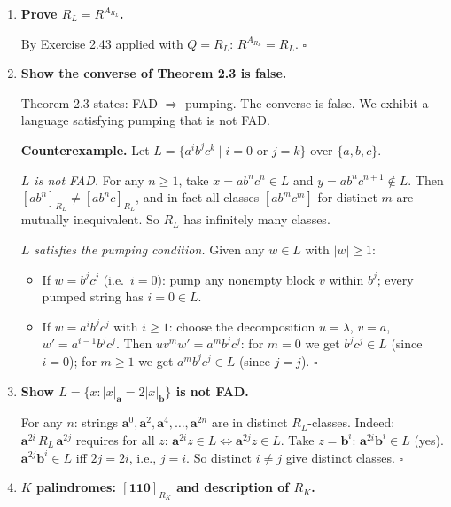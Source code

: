 \begin{enumerate}[{2.}1.]
\item \textbf{Prove $R_L=R^{A_{R_L}}$.}

By Exercise 2.43 applied with $Q=R_L$: $R^{A_{R_L}}=R_L$. $\square$

\item \textbf{Show the converse of Theorem 2.3 is false.}

Theorem 2.3 states: FAD $\Rightarrow$ pumping. The converse is false. We exhibit a language satisfying pumping that is not FAD.

\textbf{Counterexample.} Let $L=\{a^ib^jc^k\mid i=0\text{ or }j=k\}$ over $\{a,b,c\}$.

\emph{$L$ is not FAD.} For any $n\geq 1$, take $x=ab^nc^n\in L$ and $y=ab^nc^{n+1}\notin L$. Then $[ab^n]_{R_L}\neq[ab^nc]_{R_L}$, and in fact all classes $[ab^mc^m]$ for distinct $m$ are mutually inequivalent. So $R_L$ has infinitely many classes.

\emph{$L$ satisfies the pumping condition.} Given any $w\in L$ with $|w|\geq 1$:
\begin{itemize}
\item If $w=b^jc^j$ (i.e.\ $i=0$): pump any nonempty block $v$ within $b^j$; every pumped string has $i=0\in L$.
\item If $w=a^ib^jc^j$ with $i\geq 1$: choose the decomposition $u=\lambda$, $v=a$, $w'=a^{i-1}b^jc^j$. Then $uv^mw'=a^mb^jc^j$: for $m=0$ we get $b^jc^j\in L$ (since $i=0$); for $m\geq 1$ we get $a^mb^jc^j\in L$ (since $j=j$). $\square$
\end{itemize}

\item \textbf{Show $L=\{x:|x|_\mathbf{a}=2|x|_\mathbf{b}\}$ is not FAD.}

For any $n$: strings $\mathbf{a}^0,\mathbf{a}^2,\mathbf{a}^4,\ldots,\mathbf{a}^{2n}$ are in distinct $R_L$-classes. Indeed: $\mathbf{a}^{2i}\,R_L\,\mathbf{a}^{2j}$ requires for all $z$: $\mathbf{a}^{2i}z\in L\Leftrightarrow\mathbf{a}^{2j}z\in L$. Take $z=\mathbf{b}^i$: $\mathbf{a}^{2i}\mathbf{b}^i\in L$ (yes). $\mathbf{a}^{2j}\mathbf{b}^i\in L$ iff $2j=2i$, i.e., $j=i$. So distinct $i\neq j$ give distinct classes. $\square$

\item \textbf{$K$ palindromes: $[\mathbf{110}]_{R_K}$ and description of $R_K$.}


\end{enumerate}

